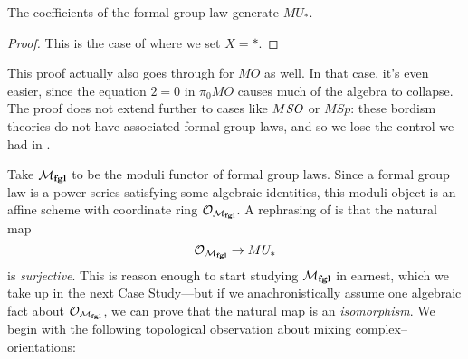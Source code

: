 \begin{corollary}\label{QuillenSurjective}
The coefficients of the formal group law generate \(MU_*\).
\end{corollary}
\begin{proof}
This is the case of  where we set \(X = *\).
\end{proof}

\begin{remark}
This proof actually also goes through for \(MO\) as well.  In that case, it's even easier, since the equation \(2 = 0\) in \(\pi_0 MO\) causes much of the algebra to collapse.  The proof does not extend further to cases like \(M\mathit{SO}\) or \(M\mathit{Sp}\): these bordism theories do not have associated formal group laws, and so we lose the control we had in .
\end{remark}

Take \(\mathcal{M}_{\mathbf{fgl}}\) to be the moduli functor of formal group laws.  Since a formal group law is a power series satisfying some algebraic identities, this moduli object is an affine scheme with coordinate ring \(\mathcal{O}_{\mathcal{M}_{\mathbf{fgl}}}\).  A rephrasing of  is that the natural map \[\mathcal{O}_{\mathcal{M}_{\mathbf{fgl}}} \to MU_*\] is \emph{surjective}.  This is reason enough to start studying \(\mathcal{M}_{\mathbf{fgl}}\) in earnest, which we take up in the next Case Study---but if we anachronistically assume one algebraic fact about \(\mathcal{O}_{\mathcal{M}_{\mathbf{fgl}}}\), we can prove that the natural map is an \emph{isomorphism}.  We begin with the following topological observation about mixing complex--orientations:


